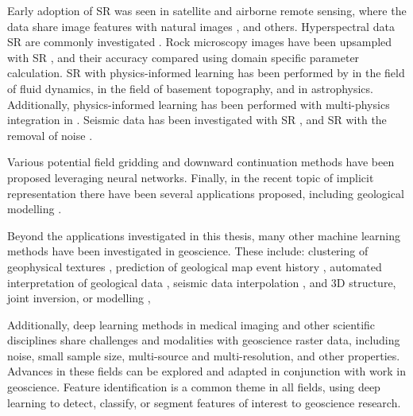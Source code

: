 Early adoption of SR was seen in satellite and airborne remote sensing, where the data share image features with natural images \parencite{lanarasSuperresolutionSentinel2Images2018,arunConvolutionalNetworkArchitectures2019,kawulokTrainingDeepNetworks2019}, and others.
Hyperspectral data SR are commonly investigated \parencite{yangHyperspectralImageClassification2018,arunCNNBasedSuperResolutionHyperspectral2020}.
Rock microscopy images have been upsampled with SR \parencite{niuInnovativeApplicationGenerative2020}, and their accuracy compared using domain specific parameter calculation.
SR with physics-informed learning has been performed by \textcite{bodeUsingPhysicsinformedEnhanced2021,jiangMeshfreeFlowNetPhysicsconstrainedDeep2020} in the field of fluid dynamics, \textcite{leongDeepBedMapDeepNeural2020} in the field of basement topography, and \textcite{jungbluthSingleframeSuperresolutionSolar2019} in astrophysics.
Additionally, physics-informed learning has been performed with multi-physics integration in \textcite{degen3DMultiphysicsUncertainty2022}.
Seismic data has been investigated with SR \parencite{liSuperresolutionSeismicVelocity2021}, and SR with the removal of noise \parencite{liDeepLearningSimultaneous2021}.

Various potential field gridding \parencite{naprstekNewMethodInterpolating2019, wangDeepLearningGravity2019a} and downward continuation methods \parencite{liStableDownwardContinuation2023,yeHighprecisionDownwardContinuation2022} have been proposed leveraging neural networks.
Finally, in the recent topic of implicit representation there have been several applications proposed, including geological modelling \parencite{hillierGeoINRImplicitNeural2023}.

Beyond the applications investigated in this thesis, many other machine learning methods have been investigated in geoscience.
These include: clustering of geophysical textures \parencite{grujicGeophysicsNeuralNetworks2019}, prediction of geological map event history \parencite{guo3DGeologicalStructure2021}, automated interpretation of geological data \parencite{waldelandConvolutionalNeuralNetworks2018, babakhinSemisupervisedSegmentationSalt2019,dawsonImpactDatasetSize2023}, seismic data interpolation \parencite{wangDeeplearningbasedSeismicData2018}, and 3D structure, joint inversion, or modelling \parencite{guo3DGeologicalStructure2021},

Additionally, deep learning methods in medical imaging and other scientific disciplines share challenges and modalities with geoscience raster data, including noise, small sample size, multi-source and multi-resolution, and other properties.
Advances in these fields can be explored and adapted in conjunction with work in geoscience.
Feature identification is a common theme in all fields, using deep learning to detect, classify, or segment features of interest to geoscience research.

